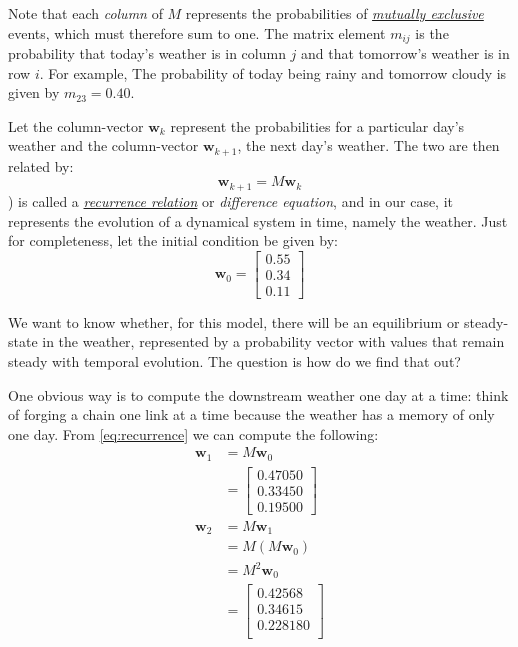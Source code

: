 \documentclass[
  11pt,
  british,
  a4paper,
]{article}
\begin{document}
Note that each \emph{column} of \(M\) represents the probabilities of
\href{https://en.wikipedia.org/wiki/Mutual_exclusivity}{\emph{mutually
exclusive}} events, which must therefore sum to one. The matrix element
\(m_{ij}\) is the probability that today's weather is in column \(j\)
and that tomorrow's weather is in row \(i\). For example, The
probability of today being rainy and tomorrow cloudy is given by
\(m_{23} = 0.40\).

Let the column-vector \(\symbf{w}_{k}\) represent the probabilities for
a particular day's weather and the column-vector \(\symbf{ w}_{k+1}\),
the next day's weather. The two are then related by: \begin{equation}
\symbf{w}_{k+1} = M\symbf{w}_{k}
\label{eq:recurrence}\end{equation} ) is called a
\href{https://en.wikipedia.org/wiki/Recurrence_relation}{\emph{recurrence
relation}} or \emph{difference equation}, and in our case, it represents
the evolution of a dynamical system in time, namely the weather. Just
for completeness, let the initial condition be given by:
\begin{equation}
\symbf{w}_{0} = \begin{bmatrix}0.55\\0.34\\0.11\end{bmatrix}
\label{eq:initial}\end{equation}

We want to know whether, for this model, there will be an equilibrium or
steady-state in the weather, represented by a probability vector with
values that remain steady with temporal evolution. The question is how
do we find that out?

One obvious way is to compute the downstream weather one day at a time:
think of forging a chain one link at a time because the weather has a
memory of only one day. From \cref{eq:recurrence} we can compute the
following: \[
\begin{aligned}
\symbf{w}_{1} &= M\symbf {w}_{0}\\
&= \begin{bmatrix}0.47050\\ 0.33450\\0.19500\end{bmatrix}\\
\symbf{w}_{2} &= M\symbf{w}_{1}\\
&= M(M\symbf{w}_{0})\\
&= M^{2}\symbf{w}_{0}\\
&= \begin{bmatrix}0.42568\\0.34615\\0.228180\\\end{bmatrix}
\end{aligned}
\]
\end{document}
